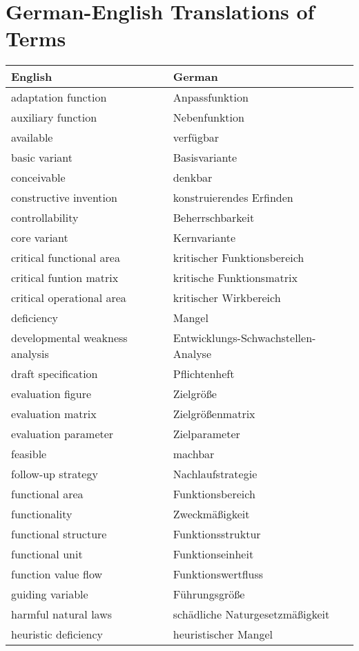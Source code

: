 \documentclass[11pt,a4paper]{article}
\begin{document}
\section{German-English Translations of Terms}
\begin{center}
  \begin{tabular}{l|l}
    English & German \\\hline
    adaptation function & Anpassfunktion \\
    auxiliary function & Nebenfunktion \\
    available & verfügbar \\
    basic variant & Basisvariante\\
    conceivable & denkbar \\
    constructive invention & konstruierendes Erfinden \\
    controllability & Beherrschbarkeit \\
    core variant & Kernvariante\\
    critical functional area & kritischer Funktionsbereich\\
    critical funtion matrix & kritische Funktionsmatrix\\
    critical operational area & kritischer Wirkbereich\\
    deficiency & Mangel \\
    developmental weakness analysis & Entwicklungs-Schwachstellen-Analyse\\
    draft specification & Pflichtenheft \\
    evaluation figure & Zielgröße\\
    evaluation matrix& Zielgrößenmatrix \\
    evaluation parameter & Zielparameter \\
    feasible & machbar \\
    follow-up strategy & Nachlaufstrategie \\
    functional area & Funktionsbereich \\
    functionality & Zweckmäßigkeit \\
    functional structure & Funktionsstruktur \\
    functional unit & Funktionseinheit \\
    function value flow & Funktionswertfluss \\
    guiding variable & Führungsgröße \\
    harmful natural laws & schädliche Naturgesetzmäßigkeit\\
    heuristic deficiency & heuristischer Mangel\\

\end{tabular}
\end{center}
\end{document}
